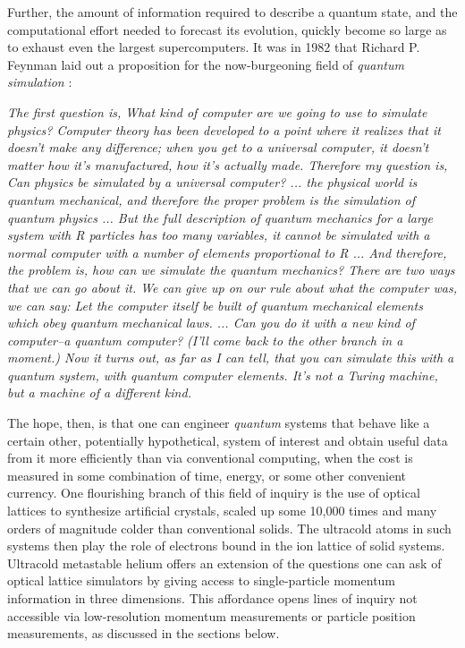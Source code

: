 		
	

	Further, the amount of information required to describe a quantum state, and the computational effort needed to forecast its evolution, quickly become so large as to exhaust even the largest supercomputers.
	It was in 1982 that Richard P.	Feynman laid out a proposition for the now-burgeoning field of \emph{quantum simulation} \cite{Feynman82}:

	\bigskip

	\begin{flushright}
	\singlespacing
	\emph{The first question is, What kind of computer are we going to use to simulate physics? Computer theory has been developed to a point where it realizes that it doesn't make any difference; when you get to a universal computer, it doesn't matter how it's manufactured, how it's actually made. Therefore my question is, Can physics be simulated by a universal computer? ... the physical world is quantum mechanical, and therefore the proper problem is the simulation of quantum physics ... But the full description of quantum mechanics for a large system with R particles  has too many variables, it cannot be simulated with a normal computer with a number of elements proportional to R ... And therefore, the problem is, how can we simulate the quantum mechanics? There are two ways that we can go about it. We can give up on our rule about what the computer was, we can say: Let the computer itself be built of quantum mechanical elements which obey quantum mechanical laws.  ... Can you do it with a new kind of computer--a quantum computer? (I'll come back to the other branch in a moment.) Now it turns out, as far as I can tell, that you can simulate this with a quantum system, with quantum computer elements. It's not a Turing machine, but a machine of a different kind.}
	\end{flushright}
	\bigskip

	The hope, then, is that one can engineer \emph{quantum} systems that behave like a certain other, potentially hypothetical, system of interest and obtain useful data from it more efficiently than via conventional computing, when the cost is measured in some combination of time, energy, or some other convenient currency.
	One flourishing branch of this field of inquiry is the use of {optical lattices} to synthesize artificial crystals, scaled up some 10,000 times and many orders of magnitude colder than conventional solids.
	The ultracold atoms in such systems then play the role of electrons bound in the ion lattice of solid systems.
	Ultracold metastable helium offers an extension of the questions one can ask of optical lattice simulators by giving access to single-particle momentum information in three dimensions.
	This affordance opens lines of inquiry not accessible via low-resolution momentum measurements or particle position measurements, as discussed in the sections below.

